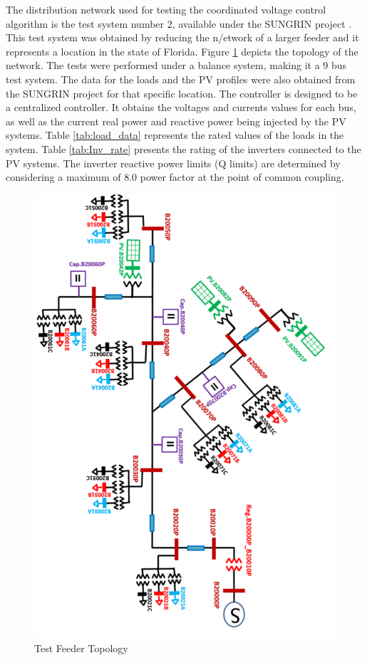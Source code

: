 The distribution network used for testing the coordinated voltage control algorithm is the test system number 2, available under the SUNGRIN project \cite{SG}. This test system was obtained by reducing the n/etwork of a larger feeder and it represents a location in the state of Florida. Figure \ref{fig:Feeder2} depicts the topology of the network. The tests were performed under a balance system, making it a 9 bus test system. The data for the loads and the PV profiles were also obtained from the SUNGRIN project  for that specific location. The controller is designed to be a centralized controller. It obtains the voltages and currents values for each bus, as well as the current real power and reactive power being injected by the PV systems. Table \ref{tab:load_data} represents the rated values of the loads in the system. Table \ref{tab:Inv_rate} presents the rating of the inverters connected to the PV systems. The inverter reactive power limits (Q limits) are determined by considering a maximum of 8.0 power factor at the point of common coupling. 

\begin{figure}[!h]
\centering
\includegraphics[width=\linewidth]{figs/feeder_r.png}
\caption{Test Feeder Topology}
\label{fig:Feeder2}
\end{figure}

